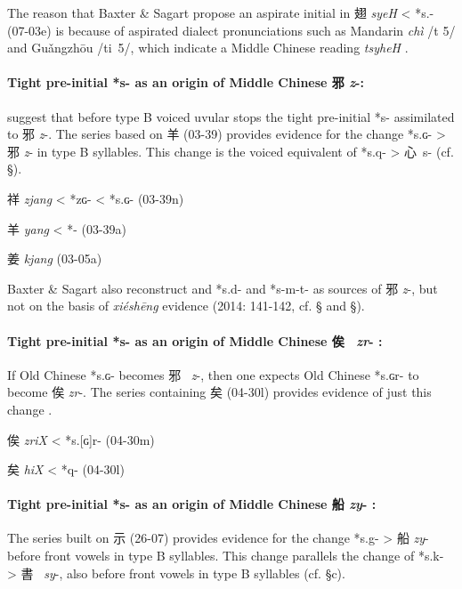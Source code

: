 The reason that Baxter \& Sagart propose an aspirate initial in 翅
 \emph{syeH} \textless{} *s.{}- (07-03e) is because of aspirated dialect
pronunciations such as Mandarin \emph{chì} /t{} 5/ and Guǎngzhōu
/t{}i~5/, which indicate a Middle Chinese reading  \emph{tsyheH} 
\citeyearpar[140]{Baxter2014OldChinese}.

\paragraph{Tight pre-initial *s- as an origin
of Middle Chinese 邪  \emph{z}-:} 
\label{par:tight-pre-initial-s-for-MC-z}
\citet[141]{Baxter2014OldChinese}
suggest that before type B voiced uvular stops the tight
pre-initial *s- assimilated to 邪 \emph{z}-. The series based on 羊
(03-39) provides evidence for the change *s.ɢ- \textgreater{} 邪
 \emph{z}- in type B syllables. This change is the voiced equivalent of
*s.q- \textgreater{} 心~s- (cf. §).

\begin{description} \item
祥  \emph{zjang} \textless{} *zɢ- \textless{} *s.ɢ- (03-39n)
 \item
羊  \emph{yang} \textless{} *{}- (03-39a)
 \item
姜  \emph{kjang} (03-05a)
\end{description}

Baxter \& Sagart also reconstruct and *s.d- and *s-m-t- as sources of 邪
 \emph{z}-, but not on the basis of  \emph{xiéshēng} evidence (2014:
141-142, cf. § and §).

\paragraph{Tight pre-initial *s- as an origin
of Middle Chinese 俟~ \emph{zr}- :}
If Old Chinese *s.ɢ- becomes 邪~ \emph{z}-, then one expects Old Chinese
*s.ɢr- to become 俟 \emph{zr}-. The series containing 矣 (04-30l)
provides evidence of just this change 
\citep[141]{Baxter2014OldChinese}.

\begin{description} \item
俟  \emph{zriX} \textless{} *s.{[}ɢ]r- (04-30m)
 \item
矣  \emph{hiX} \textless{} *q- (04-30l)
\end{description}

\paragraph{Tight pre-initial *s- as an origin
of Middle Chinese 船  \emph{zy}- {:}}
The series built on 示 (26-07) provides evidence for the change *s.g-
\textgreater{} 船 \emph{zy}-\emph{ }before front vowels in type B
syllables. This change parallels the change of *s.k- \textgreater{}
書~ \emph{sy}-, also before front vowels in type B syllables (cf. §c).

